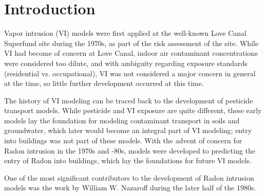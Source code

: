 \section{Introduction}\label{sec:chp2_intro}

Vapor intrusion (VI) models were first applied at the well-known Love Canal Superfund site during the 1970s, as part of the risk assessment of the site\cite{noauthor_history_2019}.
While VI had become of concern at Love Canal, indoor air contaminant concentrations were considered too dilute, and with ambiguity regarding exposure standards (residential vs. occupational), VI was not considered a major concern in general at the time\cite{little_measuring_2017}, so little further development occurred at this time.\par

The history of VI modeling can be traced back to the development of pesticide transport models.
While pesticide and VI exposure are quite different, these early models lay the foundation for modeling contaminant transport in soils and groundwater, which later would become an integral part of VI modeling; entry into buildings was not part of these models.
With the advent of concern for Radon intrusion in the 1970s and -80s, models were developed to predicting the entry of Radon into buildings, which lay the foundations for future VI models.\par

One of the most significant contributors to the development of Radon intrusion models was the work by William W. Nazaroff during the later half of the 1980s.

